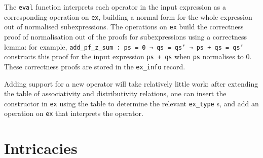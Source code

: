 \documentclass{llncs}
\newcommand{\lean}[1]{\texttt{#1}\xspace} %
\newcommand{\ex}{\lean{ex}}
\newcommand{\ring}{\lean{ring}}
\newcommand{\ringexp}{\lean{ring\_exp}}
\begin{document}

The \lean{eval} function interprets each operator in the input expression as a corresponding operation on \ex,
building a normal form for the whole expression out of normalised subexpressions.
The operations on \ex build the correctness proof of normalisation out of the proofs for subexpressions
using a correctness lemma: for example, \lean{add\_pf\_z\_sum : ps = 0 → qs = qs' → ps + qs = qs'} constructs this proof for the input expression \lean{ps + qs} when \lean{ps} normalises to $0$.
These correctness proofs are stored in the \lean{ex\_info} record. %

Adding support for a new operator will take relatively little work:
after extending the table of associativity and distributivity relations,
one can insert the constructor in \ex using the table to determine the relevant \lean{ex\_type}s,
and add an operation on \ex that interprets the operator.


\section{Intricacies}
\end{document}
